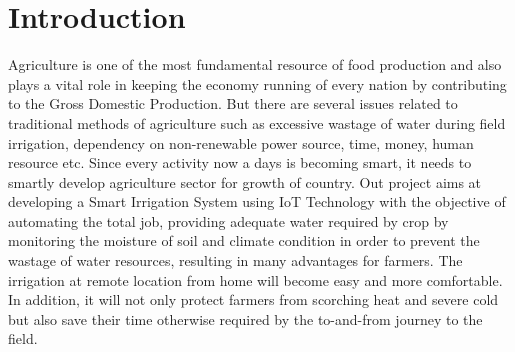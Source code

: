 \section{Introduction}
Agriculture is one of the most fundamental resource of food production and also plays a vital role in keeping the economy running of every nation by contributing to the Gross Domestic Production. But there are several issues related to traditional methods of agriculture such as excessive wastage of water during field irrigation, dependency on non-renewable power source, time, money, human resource etc. Since every activity now a days is becoming smart, it needs to smartly develop agriculture sector for growth of country. Out project aims at developing a Smart Irrigation System using IoT Technology with the objective of automating the total job, providing adequate water required by crop by monitoring the moisture of soil and climate condition in order to prevent the wastage of water resources, resulting in many advantages for farmers. The irrigation at remote location from home will become easy and more comfortable. In addition, it will not only protect farmers from scorching heat and severe cold but also save their time otherwise required by the to-and-from journey to the field.

